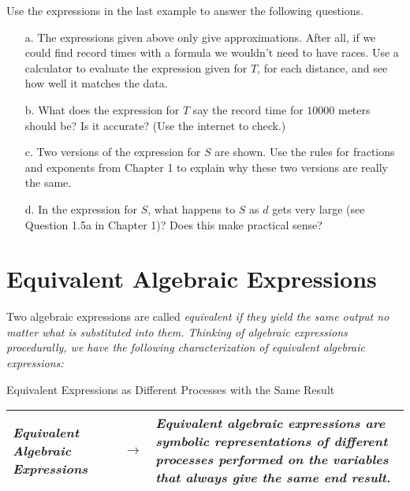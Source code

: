 \begin{question} Use the expressions in the last example to answer the following questions.  
\begin{enumerate} 
\item[a.] The expressions given above only give approximations. After all, if we could find record times with a formula we wouldn't need to have races. Use a calculator to evaluate the expression given for $T$, for each distance, and see how well it matches the data.
\item[b.] What does the expression for $T$ say the record time for $10000$ meters should be? Is it accurate? (Use the internet to check.)
\item[c.] Two versions of the expression for $S$ are shown. Use the rules for fractions and exponents from Chapter 1 to explain why these two versions are really the same.
\item[d.] In the expression for $S$, what happens to $S$ as $d$ gets very large (see Question 1.5a in Chapter 1)? Does this make practical sense?
\end{enumerate}  
\end{question}
 

\section{Equivalent Algebraic Expressions}

Two algebraic expressions are called \it{equivalent} \normalfont if they yield the same output no matter what is substituted into them. Thinking of algebraic expressions procedurally, we have the following characterization of equivalent algebraic expressions:

\begin{center}
Equivalent Expressions as Different Processes with the Same Result
\begin{tabular}{|p{2.5in} c p{2.5in} |}
\hline\hline \it{Equivalent Algebraic Expressions} & $\rightarrow$ & \it{Equivalent algebraic expressions are symbolic representations of different processes performed on the variables that always give the same end result.}\\
\hline
\end{tabular}
\end{center}

\par

